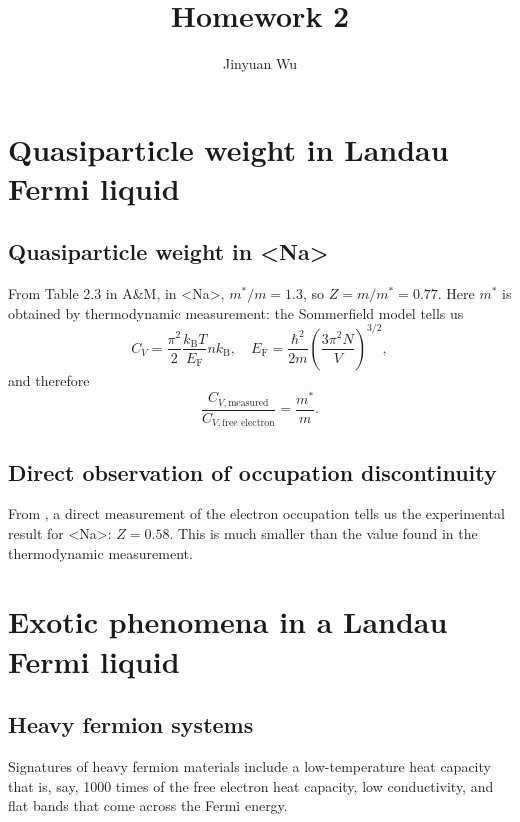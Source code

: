 \documentclass[hyperref, a4paper]{article}
\title{Homework 2}
\author{Jinyuan Wu}
\def\ce#1{<#1>}%
\newcommand*{\efermi}{E_{\text{F}}}
\newcommand*{\kB}{k_{\text{B}}}
\begin{document}
\maketitle

\section{Quasiparticle weight in Landau Fermi liquid}

\subsection{Quasiparticle weight in \ce{Na}}

From Table 2.3 in A\&M, in \ce{Na}, 
$m^* / m = 1.3$, 
so $Z = m / m^* = 0.77$.
Here $m^*$ is obtained by thermodynamic measurement:
the Sommerfield model tells us 
\begin{equation}
    C_V = \frac{\pi^2}{2} \frac{\kB T}{\efermi} n \kB, \quad 
    \efermi = \frac{\hbar^2}{2m} \left(\frac{3 \pi^2 N}{V}\right)^{3/2},
\end{equation}
and therefore 
\begin{equation}
    \frac{C_{V, \text{measured}}}{C_{V, \text{free electron}}} = \frac{m^*}{m}.
\end{equation}

\subsection{Direct observation of occupation discontinuity}

From \cite{huotari2010momentum}, 
a direct measurement of the electron occupation 
tells us the experimental result for \ce{Na}: $Z = 0.58$.
This is much smaller than the value found in the thermodynamic measurement.


\section{Exotic phenomena in a Landau Fermi liquid}

\subsection{Heavy fermion systems}

Signatures of heavy fermion materials include 
a low-temperature heat capacity that is, say, 1000 times 
of the free electron heat capacity,
low conductivity, 
and flat bands that come across the Fermi energy.
\end{document}

